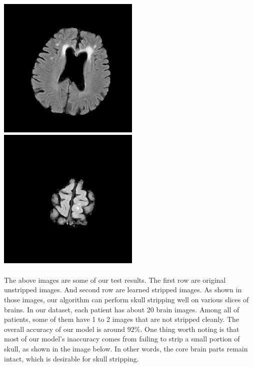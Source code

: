 \documentclass[conference]{IEEEtran}
\begin{document}
\includegraphics[scale = 0.2]{stripped_14.png}
\includegraphics[scale = 0.2]{stripped_21.png}
\\\\
The above images are some of our test results. The first row are original unstripped images. And second row are learned stripped images. As shown in those images, our algorithm can perform skull stripping well on various slices of brains.
In our dataset, each patient has about 20 brain images. Among all of patients, some of them have 1 to 2 images that are not stripped cleanly. The overall accuracy of our model is around $92\%$. One thing worth noting is that most of our model's inaccuracy comes from failing to strip a small portion of skull, as shown in the image below. In other words, the core brain parts remain intact, which is desirable for skull stripping.\\
\end{document}
